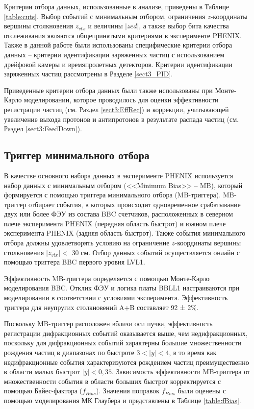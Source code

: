Критерии отбора данных, использованные в анализе, приведены в Таблице \ref{table:cuts}. Выбор событий с минимальным отбором, ограничения $z$-координаты вершины столкновения $z_{vtx}$ и величины $|zed|$, а также выбор бита качества отслеживания являются общепринятыми критериями в эксперименте PHENIX. Также в данной работе были использованы специфические критерии отбора данных -- критерии идентификации заряженных частиц с использованием дрейфовой камеры и времяпролетных детекторов. Критерии идентификации заряженных частиц рассмотрены в Разделе \ref{sect3_PID}.

Приведенные критерии отбора данных были также использованы при Монте-Карло моделировании, которое проводилось для оценки эффективности регистрации частиц (см. Раздел \ref{sect3:EffRec}) и коррекции, учитывающей увеличение выхода протонов и антипротонов в результате распада частиц (см. Раздел \ref{sect3:FeedDown}). 

\subsection{Триггер минимального отбора}
В качестве основного набора данных в эксперименте PHENIX используется набор данных с минимальным отбором (<<Minimum Bias>> -- MB), который формируется с помощью триггера минимального отбора (MB-триггера).
MB-триггер отбирает события, в которых происходит одновременное срабатывание двух или более ФЭУ из состава BBC счетчиков, расположенных в северном плече эксперимента PHENIX (передняя область быстрот) и южном плече эксперимента PHENIX (задняя область быстрот).
Также события минимального отбора должны удовлетворять условию на ограничение $z$-координаты вершины столкновения $|z_{vtx}| < $ 30 см. Отбор данных событий осуществляется онлайн с помощью триггера BBC первого уровня LVL1.

Эффективность MB-триггера определяется с помощью Монте-Карло моделирования BBC. Отклик ФЭУ и логика платы BBLL1 настраиваются при моделировании в соответствии с условиями эксперимента. Эффективность триггера для неупругих столкновений A+B составляет 92 ± 2\%. 

Поскольку MB-триггер расположен вблизи оси пучка, эффективность регистрации дифракционных событий оказывается выше, чем недифракционных, поскольку для дифракционных событий характерны большие множественности рождения частиц в диапазонах по быстроте $3 <|y|<4$, в то время как недифракционные события характеризуются рождением частиц преимущественно в области малых быстрот $|y|<0,35$. Зависимость эффективности MB-триггера от множественности события в области больших быстрот корректируется с помощью Байес-фактора ($f_{Bias}$). 
Значения поправок $f_{Bias}$ были оценены с помощью моделирования МК Глаубера и представлены в Таблице \ref{table:fBias}.

